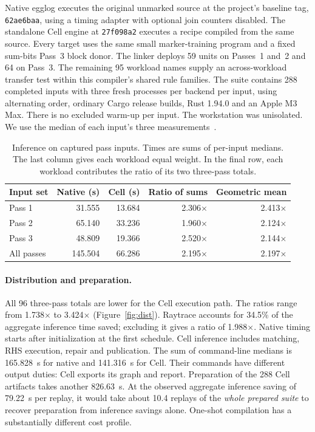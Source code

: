 \documentclass[10pt,letterpaper]{article}
\newcommand{\code}[1]{\texttt{#1}}
\newcommand{\ratio}[1]{#1\ensuremath{\times}}
\begin{document}
Native egglog executes the original unmarked source at the project's baseline tag, \code{62ae6baa}, using a timing adapter with optional join counters disabled. The standalone Cell engine at \code{27f098a2} executes a recipe compiled from the same source. Every target uses the same small marker-training program and a fixed sum-bits Pass~3 block donor. The linker deploys 59 units on Passes~1 and~2 and 64 on Pass~3. The remaining 95 workload names supply an across-workload transfer test within this compiler's shared rule families. The suite contains 288 completed inputs with three fresh processes per backend per input, using alternating order, ordinary Cargo release builds, Rust 1.94.0 and an Apple M3 Max. There is no excluded warm-up per input. The workstation was unisolated. We use the median of each input's three measurements~\cite{artifact}.

\begin{table}[ht]
\centering
\caption{Inference on captured pass inputs. Times are sums of per-input medians. The last column gives each workload equal weight. In the final row, each workload contributes the ratio of its two three-pass totals.}
\label{tab:suite}
\begin{tabular}{lrrrr}
\toprule
Input set & Native (s) & Cell (s) & Ratio of sums & Geometric mean\\
\midrule
Pass 1 & 31.555 & 13.684 & \ratio{2.306} & \ratio{2.413}\\
Pass 2 & 65.140 & 33.236 & \ratio{1.960} & \ratio{2.124}\\
Pass 3 & 48.809 & 19.366 & \ratio{2.520} & \ratio{2.144}\\
\midrule
All passes &145.504&66.286&\ratio{2.195}&\ratio{2.197}\\
\bottomrule
\end{tabular}
\end{table}

\paragraph{Distribution and preparation.}
All 96 three-pass totals are lower for the Cell execution path. The ratios range from \ratio{1.738} to \ratio{3.424} (Figure~\ref{fig:dist}). Raytrace accounts for 34.5\% of the aggregate inference time saved; excluding it gives a ratio of \ratio{1.988}. Native timing starts after initialization at the first schedule. Cell inference includes matching, RHS execution, repair and publication. The sum of command-line medians is 165.828~s for native and 141.316~s for Cell. Their commands have different output duties: Cell exports its graph and report. Preparation of the 288 Cell artifacts takes another 826.63~s. At the observed aggregate inference saving of 79.22~s per replay, it would take about 10.4 replays of the \emph{whole prepared suite} to recover preparation from inference savings alone. One-shot compilation has a substantially different cost profile.
\end{document}
